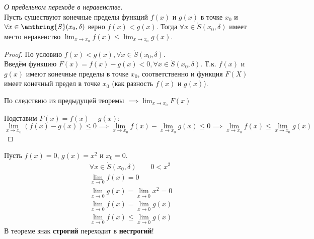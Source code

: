 \begin{theorem}
  \textit{О предельном переходе в неравенстве}. \\
  Пусть существуют конечные пределы функций $f(x)$ и  $g(x)$ в точке $x_0$ и $\forall x \in \amthring{S}(x_0, \delta)$ верно $f(x) < g(x)$. Тогда $\forall x \in \mathring{S}(x_0, \delta)$ имеет место неравенство $\lim_{x \to x_0} f(x) \le \lim_{x \to x_0} g(x)$.
\end{theorem}
\begin{proof}
  По условию $f(x) < g(x), \forall x \in \mathring{S}(x_0, \delta)$. \\
  Введём функцию $F(x) = f(x) - g(x) < 0, \forall x \in \mathring{S}(x_0, \delta)$. 
  Т.к. $f(x)$ и $g(x)$ имеют конечные пределы в точке $x_0$, соответственно и функция $F(X)$ имеет конечный предел в точке $x_0$ (как разность $f(x)$ и $g(x)$).
  
  По следствию из предыдущей теоремы
  $\implies \lim_{x \to x_0} F(x) $ 
  
  Подставим $F(x) = f(x) - g(x)$: \[
    \lim_{x \to x_0} \left( f(x) - g(x) \right) \le 0 \implies \lim_{x \to x_0} f(x) - \lim_{x \to x_0} g(x) \le 0 \implies \lim_{x \to x_0} f(x) \le \lim_{x \to x_0} g(x) 
  \]
\end{proof}
\begin{eg}
  Пусть $f(x) = 0$, $g(x) = x^2$ и $x_0 = 0$. \\
  \begin{gather*}
    \forall x \in \mathring{S}(x_0, \delta) \qquad 0 < x^2 \\
    \lim_{x \to 0} f(x) = 0 \\
    \lim_{x \to 0} g(x) = \lim_{x \to 0} x^2 = 0 \\
    \lim_{x \to 0} f(x) = \lim_{x \to 0} g(x) \\
    \lim_{x \to 0} f(x) \le \lim_{x \to 0} g(x) 
  \end{gather*}
  В теореме знак \textbf{строгий} переходит в \textbf{нестрогий}!  
\end{eg}

